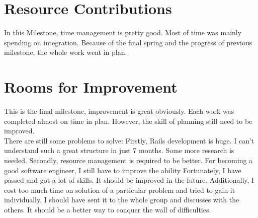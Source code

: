 \section*{Resource Contributions}

In this Milestone, time management is pretty good. Most of time was mainly spending on integration. Because of the final spring and the progress of previous milestone, the whole work went in plan.

\section*{Rooms for Improvement}

This is the final milestone, improvement is great obviously. Each work was completed almost on time in plan. However, the skill of planning still need to be improved.\\

There are still some problems to solve: Firstly, Rails development is huge. I can't understand such a great structure in just 7 months. Some more research is needed. Secondly, resource management is required to be better. For becoming a good software engineer, I still have to improve the ability Fortunately, I have passed and got a lot of skills. It should be improved in the future. Additionally, I cost too much time on solution of a particular problem and tried to gain it individually. I should have sent it to the whole group and discusses with the others. It should be a better way to conquer the wall of difficulties.

